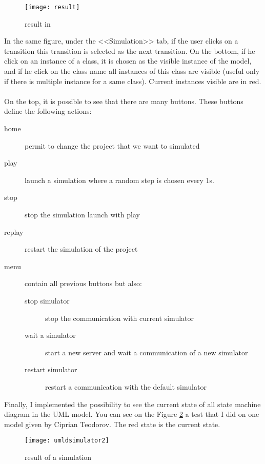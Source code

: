 \begin{figure}[h]
  \centering
  \texttt{[image: result]}
  \caption{result in \umld}
  \label{fig:result}
\end{figure}

In the same figure, under the <<Simulation>> tab, if the user clicks on a transition this transition is selected as the next transition. On the bottom, if he click on an instance of a class, it is chosen as the visible instance of the model, and if he click on the class name all instances of this class are visible (useful only if there is multiple instance for a same class). Current instances visible are in red.
~\\

On the top, it is possible to see that there are many buttons. These buttons define the following actions:

\noitemsep
\begin{description}
\item[home] permit to change the project that we want to simulated
\item[play] launch a simulation where a random step is chosen every 1s.
\item[stop] stop the simulation launch with play
\item[replay] restart the simulation of the project
\item[menu] contain all previous buttons but also:
  \begin{description}
  \item[stop simulator] stop the communication with current simulator
  \item[wait a simulator] start a new server and wait a communication of a new simulator
  \item[restart simulator] restart a communication with the default simulator
  \end{description}
\end{description}
\doitemsep


Finally, I implemented the possibility to see the current state of all state machine diagram in the UML model. You can see on the Figure \ref{fig:result2} a test that I did on one model given by Ciprian Teodorov. The red state is the current state.

\begin{figure}[h]
  \centering
  \texttt{[image: umldsimulator2]}
  \caption{result of a simulation}
  \label{fig:result2}
\end{figure}


